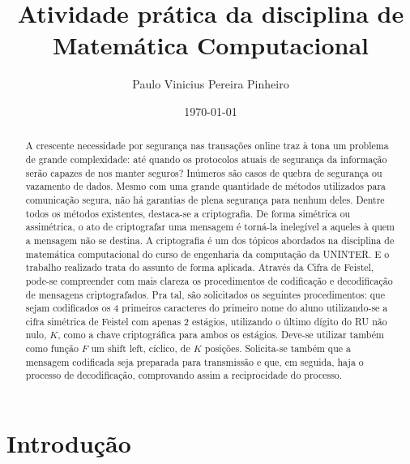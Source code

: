 \documentclass[a4paper,pra,aps,twocolumn,superscriptaddress,10pt,final]{revtex4-2}
\begin{document}
\title{Atividade prática da disciplina de Matemática Computacional}

\author{Paulo Vinicius Pereira Pinheiro}

\date{\today}

\begin{abstract}
    A crescente necessidade por segurança nas transações online traz à tona um problema de grande complexidade: até quando os protocolos atuais de segurança da informação serão capazes de nos manter seguros? Inúmeros são casos de quebra de segurança ou vazamento de dados. Mesmo com uma grande quantidade de métodos utilizados para comunicação segura, não há garantias de plena segurança para nenhum deles. Dentre todos os métodos existentes, destaca-se a criptografia. De forma simétrica ou assimétrica, o ato de criptografar uma mensagem é torná-la inelegível a aqueles à quem a mensagem não se destina. A criptografia é um dos tópicos abordados na disciplina de matemática computacional do curso de engenharia da computação da UNINTER. E o trabalho realizado trata do assunto de forma aplicada. Através da Cifra de Feistel, pode-se compreender com mais clareza os procedimentos de codificação e decodificação de mensagens criptografados. Pra tal, são solicitados os seguintes procedimentos: que sejam codificados os 4 primeiros caracteres do primeiro nome do aluno utilizando-se a cifra simétrica de Feistel com apenas 2 estágios, utilizando o último dígito do RU não nulo, $K$,  como a chave criptográfica para ambos os estágios. Deve-se utilizar também como função $F$ um shift left, cíclico, de $K$ posições. Solicita-se também que a mensagem codificada seja preparada para transmissão e que, em seguida, haja o processo de decodificação, comprovando assim a reciprocidade do processo.
    
    
\end{abstract}

\maketitle


\section{Introdução}
\label{sec:intro}
\end{document}
